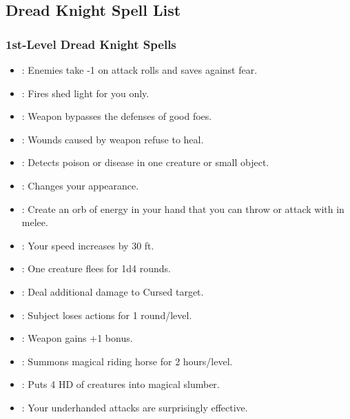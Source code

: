 \subsection{Dread Knight Spell List}
\subsubsection{1st-Level Dread Knight Spells}
\begin{itemize}
\item {}: Enemies take -1 on attack rolls and saves against fear.
\item {}: Fires shed light for you only.
\item {}: Weapon bypasses the defenses of good foes.
\item {}: Wounds caused by weapon refuse to heal.
\item {}: Detects poison or disease in one creature or small object.
\item {}: Changes your appearance.
\item {}: Create an orb of energy in your hand that you can throw or attack with in melee.
\item {}: Your speed increases by 30 ft.
\item {}: One creature flees for 1d4 rounds.
\item {}: Deal additional damage to Cursed target.
\item {}: Subject loses actions for 1 round/level.
\item {}: Weapon gains +1 bonus.
\item {}: Summons magical riding horse for 2 hours/level.
\item {}: Puts 4 HD of creatures into magical slumber.
\item {}: Your underhanded attacks are surprisingly effective.
\end{itemize}
